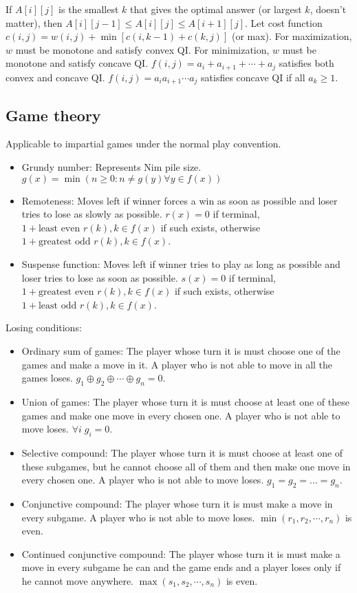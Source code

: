 \documentclass[letterpaper]{article}
\begin{document}
If $A[i][j]$ is the smallest $k$ that gives the optimal answer (or largest $k$, doesn't matter), then $A[i][j-1] \leq A[i][j] \leq A[i+1][j]$. Let cost function $c(i,j) = w(i,j) + \min\left[c(i,k-1) + c(k,j)\right]$ (or max). For maximization, $w$ must be monotone and satisfy convex QI. For minimization, $w$ must be monotone and satisfy concave QI. $f(i,j) = a_i + a_{i+1} + \cdots + a_j$ satisfies both convex and concave QI. $f(i,j) = a_ia_{i+1}\cdots a_j$ satisfies concave QI if all $a_k \geq 1$.

\subsection{Game theory}
Applicable to impartial games under the normal play convention.
\begin{itemize}
    \item Grundy number: Represents Nim pile size. $g\left(x\right) = \min\left(n \geq 0 : n \neq g\left(y\right) \forall y \in f\left(x\right)\right)$
    \item Remoteness: Moves left if winner forces a win as soon as possible and loser tries to lose as slowly as possible. $r\left(x\right) = 0$ if terminal, $1 + \text{least even } r(k), k \in f\left(x\right)$ if such exists, otherwise $1 + \text{greatest odd } r(k), k \in f\left(x\right)$.
    \item Suspense function: Moves left if winner tries to play as long as possible and loser tries to lose as soon as possible. $s\left(x\right) = 0$ if terminal, $1 + \text{greatest even } r(k), k \in f\left(x\right)$ if such exists, otherwise $1 + \text{least odd } r(k), k \in f\left(x\right)$.
\end{itemize}

Losing conditions:
\begin{itemize}
    \item Ordinary sum of games: The player whose turn it is must choose one of the games and make a move in it. A player who is not able to move in all the games loses. $g_1 \oplus g_2 \oplus \cdots \oplus g_n = 0$.
    \item Union of games: The player whose turn it is must choose at least one of these games and make one move in every chosen one.  A player who is not able to move loses. $\forall i \; g_i=0$.
    \item Selective compound: The player whose turn it is must choose at least one of these subgames, but he cannot choose all of them and then make one move in every chosen one. A player who is not able to move loses. $g_1=g_2=...=g_n$.
    \item Conjunctive compound: The player whose turn it is must make a move in every subgame. A player who is not able to move loses. $\min(r_1,r_2,\cdots,r_n)$ is even.
    \item Continued conjunctive compound: The player whose turn it is must make a move in every subgame he can and the game ends and a player loses only if he cannot move anywhere. $\max(s_1,s_2,\cdots,s_n)$ is even.
\end{itemize}
\end{document}

